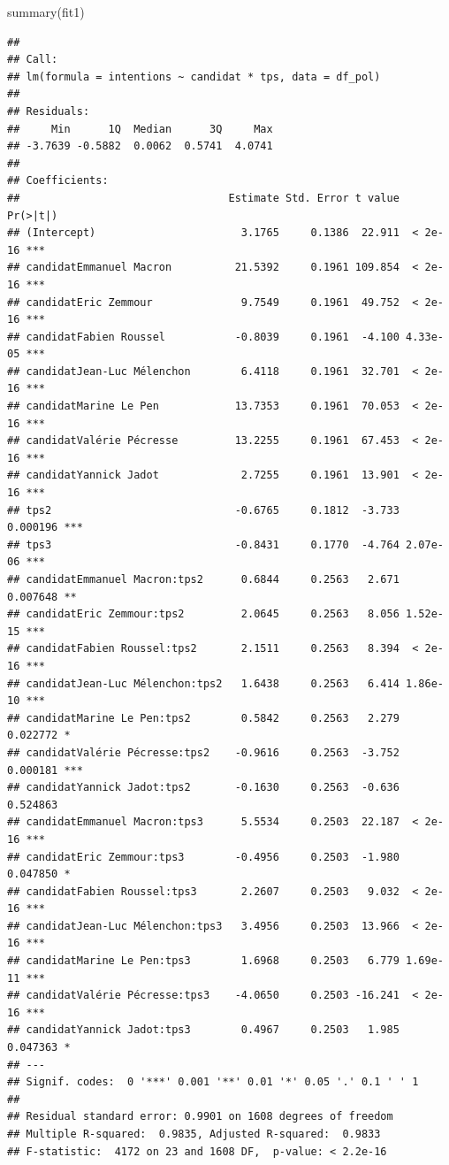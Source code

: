 \documentclass[
]{book}
\newenvironment{Shaded}{\begin{snugshade}}{\end{snugshade}}
\newcommand{\FunctionTok}[1]{\textcolor[rgb]{0.00,0.00,0.00}{#1}}
\newcommand{\NormalTok}[1]{#1}
\begin{document}
\begin{Shaded}
\begin{Highlighting}[]
\FunctionTok{summary}\NormalTok{(fit1)}
\end{Highlighting}
\end{Shaded}

\begin{verbatim}
## 
## Call:
## lm(formula = intentions ~ candidat * tps, data = df_pol)
## 
## Residuals:
##     Min      1Q  Median      3Q     Max 
## -3.7639 -0.5882  0.0062  0.5741  4.0741 
## 
## Coefficients:
##                                 Estimate Std. Error t value Pr(>|t|)    
## (Intercept)                       3.1765     0.1386  22.911  < 2e-16 ***
## candidatEmmanuel Macron          21.5392     0.1961 109.854  < 2e-16 ***
## candidatEric Zemmour              9.7549     0.1961  49.752  < 2e-16 ***
## candidatFabien Roussel           -0.8039     0.1961  -4.100 4.33e-05 ***
## candidatJean-Luc Mélenchon        6.4118     0.1961  32.701  < 2e-16 ***
## candidatMarine Le Pen            13.7353     0.1961  70.053  < 2e-16 ***
## candidatValérie Pécresse         13.2255     0.1961  67.453  < 2e-16 ***
## candidatYannick Jadot             2.7255     0.1961  13.901  < 2e-16 ***
## tps2                             -0.6765     0.1812  -3.733 0.000196 ***
## tps3                             -0.8431     0.1770  -4.764 2.07e-06 ***
## candidatEmmanuel Macron:tps2      0.6844     0.2563   2.671 0.007648 ** 
## candidatEric Zemmour:tps2         2.0645     0.2563   8.056 1.52e-15 ***
## candidatFabien Roussel:tps2       2.1511     0.2563   8.394  < 2e-16 ***
## candidatJean-Luc Mélenchon:tps2   1.6438     0.2563   6.414 1.86e-10 ***
## candidatMarine Le Pen:tps2        0.5842     0.2563   2.279 0.022772 *  
## candidatValérie Pécresse:tps2    -0.9616     0.2563  -3.752 0.000181 ***
## candidatYannick Jadot:tps2       -0.1630     0.2563  -0.636 0.524863    
## candidatEmmanuel Macron:tps3      5.5534     0.2503  22.187  < 2e-16 ***
## candidatEric Zemmour:tps3        -0.4956     0.2503  -1.980 0.047850 *  
## candidatFabien Roussel:tps3       2.2607     0.2503   9.032  < 2e-16 ***
## candidatJean-Luc Mélenchon:tps3   3.4956     0.2503  13.966  < 2e-16 ***
## candidatMarine Le Pen:tps3        1.6968     0.2503   6.779 1.69e-11 ***
## candidatValérie Pécresse:tps3    -4.0650     0.2503 -16.241  < 2e-16 ***
## candidatYannick Jadot:tps3        0.4967     0.2503   1.985 0.047363 *  
## ---
## Signif. codes:  0 '***' 0.001 '**' 0.01 '*' 0.05 '.' 0.1 ' ' 1
## 
## Residual standard error: 0.9901 on 1608 degrees of freedom
## Multiple R-squared:  0.9835, Adjusted R-squared:  0.9833 
## F-statistic:  4172 on 23 and 1608 DF,  p-value: < 2.2e-16
\end{verbatim}
\end{document}

